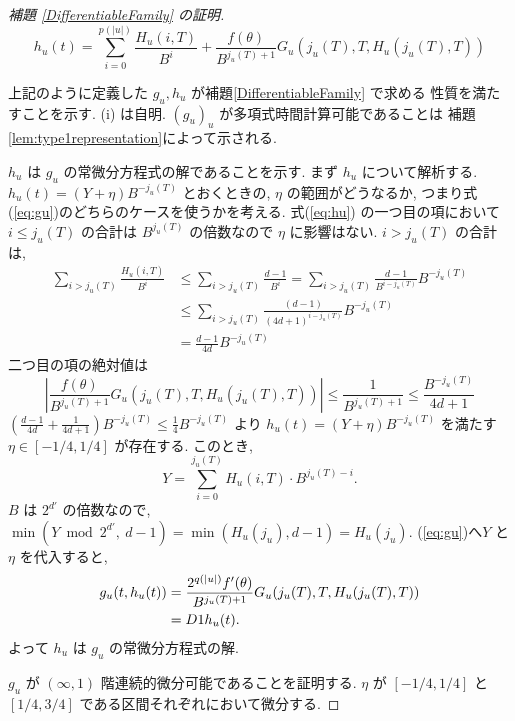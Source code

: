 \begin{proof}[\rm 補題 \ref{DifferentiableFamily} の証明]
 \begin{equation} 
  h_u(t) = \sum^{p(|u|)}_{i=0} \frac{H_u(i, T)}{B^i}  
  + \frac{f(\theta)}{B^{j_u(T)+1}} G_u(j_u(T), T, H_u(j_u(T), T)) 
  \label{eq:hu}
 \end{equation}

 上記のように定義した $g_u, h_u$ が補題\ref{DifferentiableFamily} で求める
 性質を満たすことを示す. (i) は自明. 
 $(g_u)_u$ が多項式時間計算可能であることは
 補題 \ref{lem:type1representation}によって示される.

 $h_u$ は $g_u$ の常微分方程式の解であることを示す.
 まず $h_u$ について解析する. 
  $h_u(t) = (Y + \eta) B^{-j_u(T)}$ とおくときの, $\eta$ の範囲がどうなるか,
  つまり式(\ref{eq:gu})のどちらのケースを使うかを考える.
  式(\ref{eq:hu}) の一つ目の項において
 $i \le j_u(T)$ の合計は $B^{j_u(T)}$ の倍数なので $\eta$ に影響はない.
  $i > j_u(T)$ の合計は, 
 \begin{align*}
  \sum_{i>j_u(T)} \frac{H_u(i, T)}{B^i} 
  & \le \sum_{i>j_u(T)} \frac{d-1}{B^i} 
   = \sum_{i>j_u(T)} \frac{d-1}{B^{i-j_u(T)}}B^{-j_u(T)} \\
  & \le \sum_{i>j_u(T)} \frac{(d-1)}{(4d+1)^{i-j_u(T)}}B^{-j_u(T)} \\
  & = \frac{d-1}{4d}B^{-j_u(T)}
 \end{align*}
 二つ目の項の絶対値は
 \begin{equation}
  \left| \frac{f(\theta)}{B^{j_u(T)+1}} G_u(j_u(T), T, H_u(j_u(T), T)) \right|
  \le \frac{1}{B^{j_u(T)+1}}
  \le \frac{B^{-j_u(T)}}{4d+1}
 \end{equation}
 $(\frac{d-1}{4d} + \frac{1}{4d+1})B^{-j_u(T)} \le \frac 1 4 B^{-j_u(T)} $
  より $h_u(t) = (Y + \eta) B^{-j_u(T)}$ を満たす $\eta \in [-1/4, 1/4]$
 が存在する. このとき,
 \begin{equation}
  Y = \sum_{i=0}^{j_u(T)}H_u(i, T) \cdot B^{j_u(T) - i} .
 \end{equation}
 $B$ は $2^{d'}$ の倍数なので, 
 $\min (Y \bmod 2^{d'}\!\!\!,\ d-1) = \min (H_u(j_u), d-1) = H_u(j_u)$. 
 (\ref{eq:gu})へ$Y$ と $\eta$ を代入すると,
 \begin{align*}
   g_u(t, h_u(t)) 
  & =  \frac{2^{q(|u|)} f'(\theta)}{B^{j_u(T)+1}}
   G_u(j_u(T), T, H_u(j_u(T), T)) \\
  & =  D{1}h_u(t).
 \end{align*}
 よって $h_u$ は $g_u$ の常微分方程式の解.

  $g_u$ が $(\infty, 1)$ 階連続的微分可能であることを証明する.
  $\eta$ が $[-1/4, 1/4]$ と $[1/4, 3/4]$ である区間それぞれにおいて微分する.


\end{proof}
